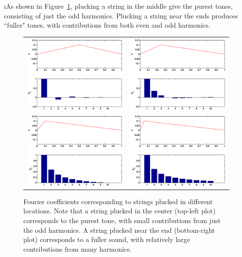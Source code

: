 \i As shown in Figure~\ref{f:pluckedstrings},
plucking a string in the middle give the 
purest tones, consisting of just the odd harmonics.
Plucking a string near the ends produces 
``fuller" tones, with contributions from both even 
and odd harmonics.
%
\begin{figure}[htbp]
\begin{center}
\begin{tabular}{cc}
\includegraphics[width=.5\textwidth]{pluckedstringharmonics1_2.pdf} &
\includegraphics[width=.5\textwidth]{pluckedstringharmonics1_4.pdf}
\\
\includegraphics[width=.5\textwidth]{pluckedstringharmonics1_10.pdf} &
\includegraphics[width=.5\textwidth]{pluckedstringharmonics1_20.pdf} 
\end{tabular}
\caption{Fourier coefficients corresponding to strings
plucked in different locations.
Note that a string plucked in the center (top-left plot)
corresponds to the purest tone, with small contributions 
from just the odd harmonics.
A string plucked near the end (bottom-right plot) corresponds
to a fuller sound, with relatively large contributions from 
many harmonics.}
\label{f:pluckedstrings}
\end{center}
\end{figure}

